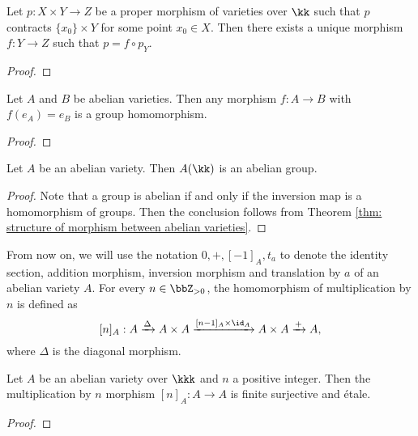     \begin{lemma}\label{lem: rigidity lemma for X product type}
        Let \(p: X \times Y \to Z\) be a proper morphism of varieties over \(\kk\) such that \(p\) contracts \(\{x_0\} \times Y\) for some point \(x_0 \in X\).
        Then there exists a unique morphism \(f: Y \to Z\) such that \(p = f \circ p_Y\).
    \end{lemma}
    \begin{proof}
    \end{proof}

    \begin{theorem}\label{thm: structure of morphism between abelian varieties}
        Let \(A\) and \(B\) be abelian varieties. 
        Then any morphism \(f: A \to B\) with \(f(e_A) = e_B\) is a group homomorphism.
    \end{theorem}
    \begin{proof}
    \end{proof}

    \begin{proposition}\label{prop: abelian varieties are abelian groups}
        Let \( A \) be an abelian variety. 
        Then \( A(\kk) \) is an abelian group.
    \end{proposition}
    \begin{proof}
        Note that a group is abelian if and only if the inversion map is a homomorphism of groups.
        Then the conclusion follows from Theorem \ref{thm: structure of morphism between abelian varieties}.
    \end{proof}

    From now on, we will use the notation \(0, +, [-1]_A, t_a\) to denote the identity section, addition morphism, inversion morphism and translation by \(a\) of an abelian variety \(A\).
    For every \(n \in \bbZ_{>0}\), the homomorphism of multiplication by \(n\) is defined as 
    \[ [n]_A: A \xrightarrow{\Delta} A \times A \xrightarrow{[n-1]_A\times \id_A} A \times A \xrightarrow{+} A, \]
    where \(\Delta\) is the diagonal morphism.

    \begin{proposition}\label{prop: multiplication by n is etale}
        Let \(A\) be an abelian variety over \(\kkk\) and \(n\) a positive integer.
        Then the multiplication by \(n\) morphism \([n]_A: A \to A\) is finite surjective and \'etale.
    \end{proposition}
    \begin{proof}
    \end{proof}

